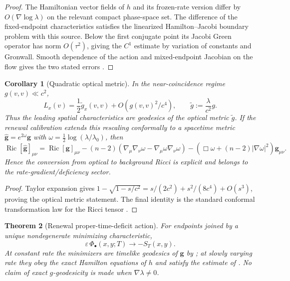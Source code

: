 \documentclass[11pt]{article}
\newtheorem{theorem}{Theorem}[section]
\newtheorem{corollary}[theorem]{Corollary}
\theoremstyle{definition}
\theoremstyle{remark}
\newcommand{\eps}{\varepsilon}
\newcommand{\Ric}{\operatorname{Ric}}
\begin{document}
\begin{proof}
The Hamiltonian vector fields of $h$ and its frozen-rate version differ by
$O(\nabla\log\lambda)$ on the relevant compact phase-space set.  The difference
of the fixed-endpoint characteristics satisfies the linearized Hamilton--Jacobi
boundary problem with this source.  Below the first conjugate point its Jacobi
Green operator has norm $O(\tau^2)$, giving the $C^1$ estimate by variation of
constants and Gronwall.  Smooth dependence of the action and mixed-endpoint
Jacobian on the flow gives the two stated errors \cite{Hartman}.
\end{proof}

\begin{corollary}[Quadratic optical metric]
\label{cor:optical-metric}
In the near-coincidence regime $g(v,v)\ll c^2$,
\[
 L_x(v)=\frac12\widetilde g_x(v,v)+O(g(v,v)^2/c^4),
 \qquad \widetilde g:=\frac{\lambda}{c^2}g.
\]
Thus the leading spatial characteristics are geodesics of the optical metric
$\widetilde g$.  If the renewal calibration extends this rescaling conformally
to a spacetime metric $\widehat{\mathbf g}=e^{2\omega}\mathbf g$ with
$\omega=\tfrac12\log(\lambda/\lambda_0)$, then
\[
 \Ric[\widehat{\mathbf g}]_{\mu\nu}=\Ric[\mathbf g]_{\mu\nu}
 -(n-2)(\nabla_\mu\nabla_\nu\omega-\nabla_\mu\omega\nabla_\nu\omega)
 -(\Box\omega+(n-2)|\nabla\omega|^2)\mathbf g_{\mu\nu}.
\]
Hence the conversion from optical to background Ricci is explicit and belongs to
the rate-gradient/deficiency sector.
\end{corollary}

\begin{proof}
Taylor expansion gives
$1-\sqrt{1-s/c^2}=s/(2c^2)+s^2/(8c^4)+O(s^3)$, proving the optical metric
statement.  The final identity is the standard conformal transformation law for
the Ricci tensor \cite{WaldBook,Besse}.
\end{proof}

\begin{theorem}[Renewal proper-time-deficit action]
\label{thm:proper-time}
For endpoints joined by a unique nondegenerate minimizing characteristic,
\[
 \eps\,\Phi_\bullet(x,y;T)\longrightarrow -S_T(x,y).
\]
At constant rate the minimizers are timelike geodesics of $\mathbf g$ by
; at slowly varying rate they obey the exact
Hamilton equations of $h$ and satisfy the estimate of
.  No claim of exact $g$-geodesicity is made when
$\nabla\lambda\ne0$.
\end{theorem}
\end{document}
